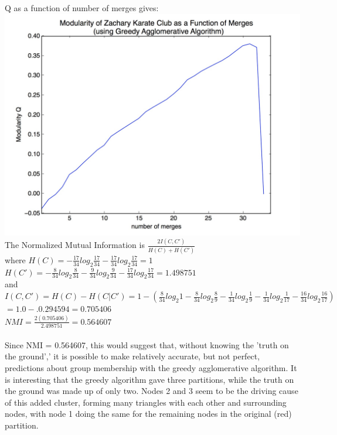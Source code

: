 \documentclass[11pt, oneside]{article}   	%
\begin{document}
Q as a function of number of merges gives:\\
\includegraphics[scale=.15]{karateMerge.jpg}\\
The Normalized Mutual Information is $\frac{2I(C,C')}{H(C)+H(C')}$\\
where $H(C) = -\frac{17}{34} log_2 {\frac{17}{34}} - \frac{17}{34} log_2 {\frac{17}{34}}=1$\\
 $H(C') =   -\frac{8}{34} log_2 {\frac{8}{34}} - \frac{9}{34} log_2 {\frac{9}{34}} - \frac{17}{34}log_2{\frac{17}{34}} =     1.498751$\\
 and $I(C,C') = H(C) - H(C|C') =   1 - (\frac{8}{34} log_2 {1} -\frac{8}{34} log_2 {\frac{8}{9}} -\frac{1}{34} log_2 {\frac{1}{9}} -\frac{1}{34} log_2 {\frac{1}{17}} -\frac{16}{34} log_2 {\frac{16}{17}} )$\\
 \indent $=1.0-.0.294594 = 0.705406$\\
 $NMI = \frac{2(0.705406)}{2.498751} = 0.564607$\\\\
 Since NMI = 0.564607, this would suggest that, without knowing the 'truth on the ground',' it is possible to make relatively accurate, but not perfect, predictions about group membership with the greedy agglomerative algorithm.  It is interesting that the greedy algorithm gave three partitions, while the truth on the ground was made up of only two.  Nodes 2 and 3 seem to be the driving cause of this added cluster, forming many triangles with each other and surrounding nodes, with node 1 doing the same for the remaining nodes in the original (red) partition.\\
\\\\
\end{document}
